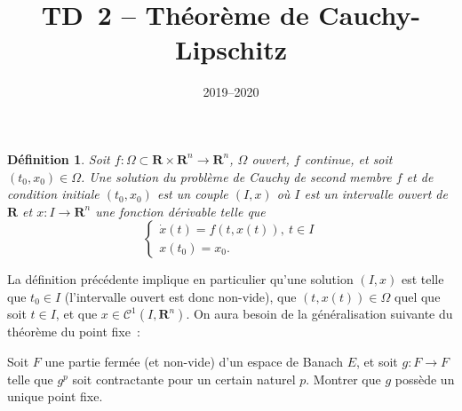 \documentclass[11pt,a4paper]{article}
\title{TD~2 -- Th\'eor\`eme de Cauchy-Lipschitz}
\date{2019--2020}
\def\R{\mathbf{R}}
\def\Cc{\mathscr{C}}
\theoremstyle{plain}
\newtheorem{dfntn}{D\'efinition}[section]
\theoremstyle{definition}
\begin{document}
\maketitle


\begin{dfntn} \label{def1}
Soit $f:\Omega \subset \R \times \R^n \to \R^n$, $\Omega$
ouvert, $f$ continue, et soit $(t_0,x_0) \in \Omega$. Une solution du
probl\`eme de Cauchy de second membre $f$ et de condition initiale
$(t_0,x_0)$ est un couple $(I,x)$ o\`u $I$ est un intervalle ouvert de $\R$ et $x:I
\to \R^n$ une fonction d\'erivable telle que
$$ \left\{ \begin{array}{l}
  \dot{x}(t)=f(t,x(t)),\ t \in I\\
  x(t_0)=x_0.
\end{array} \right. $$
\end{dfntn}

La d\'efinition pr\'ec\'edente implique en particulier qu'une solution
$(I,x)$ est telle que $t_0 \in I$ (l'intervalle ouvert est donc non-vide), 
que $(t,x(t)) \in \Omega$ quel que soit $t \in I$, et que $x \in 
\Cc^1(I,\R^n)$. On aura besoin de la g\'en\'eralisation suivante du
th\'eor\`eme du point fixe~:\\

\begin{Exercice} Soit $F$ une partie ferm\'ee (et non-vide) d'un espace de Banach $E$,
et soit $g:F \to F$ telle que $g^p$ soit contractante pour un certain naturel $p$.
Montrer que $g$ poss\`ede un unique point fixe.
\end{Exercice} \vspace*{1em}
\end{document}

